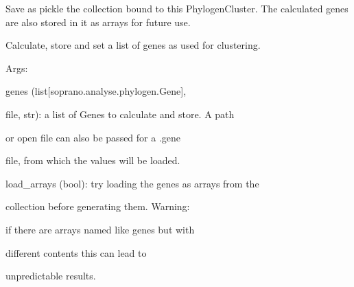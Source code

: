 \documentclass[letterpaper,10pt,english]{sphinxmanual}
\begin{document}
\begin{fulllineitems}
\begin{fulllineitems}
\end{fulllineitems}


\begin{fulllineitems}
\label{doctree/soprano.analyse.phylogen.phylogenclust:soprano.analyse.phylogen.phylogenclust.PhylogenCluster.save_collection}
Save as pickle the collection bound to this PhylogenCluster.
The calculated genes are also stored in it as arrays for future use.

\end{fulllineitems}


\begin{fulllineitems}
\label{doctree/soprano.analyse.phylogen.phylogenclust:soprano.analyse.phylogen.phylogenclust.PhylogenCluster.set_genes}
Calculate, store and set a list of genes as used for clustering.

\begin{DUlineblock}{0em}
\item[] Args:
\item[]
\begin{DUlineblock}{\DUlineblockindent}
\item[] genes (list{[}soprano.analyse.phylogen.Gene{]},
\item[]
\begin{DUlineblock}{\DUlineblockindent}
\item[] file, str): a list of Genes to calculate and store. A path
\item[]
\begin{DUlineblock}{\DUlineblockindent}
\item[] or open file can also be passed for a .gene
\item[] file, from which the values will be loaded.
\end{DUlineblock}
\end{DUlineblock}
\item[] load\_arrays (bool): try loading the genes as arrays from the
\item[]
\begin{DUlineblock}{\DUlineblockindent}
\item[] collection before generating them. Warning:
\item[] if there are arrays named like genes but with
\item[] different contents this can lead to
\item[] unpredictable results.
\end{DUlineblock}
\end{DUlineblock}
\end{DUlineblock}

\end{fulllineitems}


\end{fulllineitems}
\end{document}
